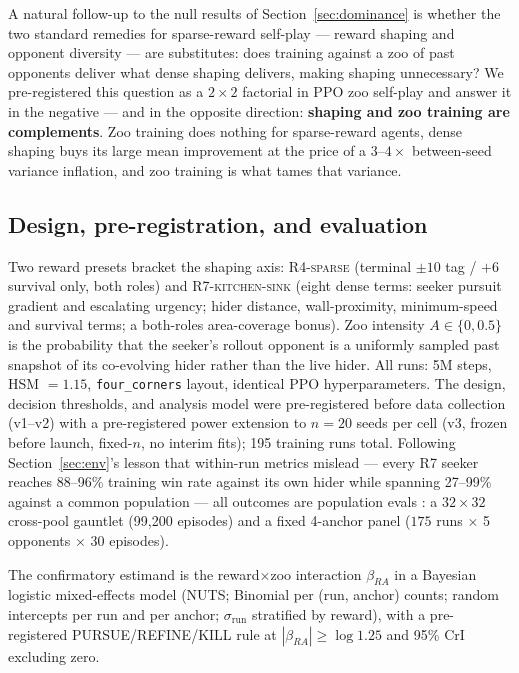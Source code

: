 \documentclass[letterpaper]{article}
\begin{document}
A natural follow-up to the null results of Section~\ref{sec:dominance}
is whether the two standard remedies for sparse-reward self-play ---
reward shaping \cite{ng1999shaping} and opponent diversity
\cite{bansal2018competitive,baker2020emergent} --- are substitutes:
does training against a zoo of past opponents deliver what dense
shaping delivers, making shaping unnecessary?
We pre-registered this question \cite{nosek2018prereg} as a $2\times2$
factorial in PPO \cite{schulman2017ppo} zoo self-play and answer it in
the negative --- and in the opposite direction: \textbf{shaping and
zoo training are complements}. Zoo training does nothing for
sparse-reward agents, dense shaping buys its large mean improvement at
the price of a $3$--$4\times$ between-seed variance inflation, and zoo
training is what tames that variance.

\subsection{Design, pre-registration, and evaluation}
\label{sec:designc-design}

Two reward presets bracket the shaping axis: \textsc{R4-sparse}
(terminal $\pm 10$ tag / $+6$ survival only, both roles) and
\textsc{R7-kitchen-sink} (eight dense terms: seeker pursuit gradient
and escalating urgency; hider distance, wall-proximity, minimum-speed
and survival terms; a both-roles area-coverage bonus).
Zoo intensity $A\in\{0,0.5\}$ is the probability that the seeker's
rollout opponent is a uniformly sampled past snapshot of its
co-evolving hider rather than the live hider.
All runs: 5M steps, HSM $=1.15$, \texttt{four\_corners} layout,
identical PPO hyperparameters.
The design, decision thresholds, and analysis model were pre-registered
before data collection (v1--v2) with a pre-registered power extension
to $n{=}20$ seeds per cell (v3, frozen before launch, fixed-$n$, no
interim fits); 195 training runs total.
Following Section~\ref{sec:env}'s lesson that within-run metrics
mislead --- every \textsc{R7} seeker reaches 88--96\% training win rate
against its own hider while spanning 27--99\% against a common
population --- all outcomes are population evals
\cite{balduzzi2018reevaluating}: a $32\times32$ cross-pool gauntlet
(99{,}200 episodes) and a fixed 4-anchor panel ($175$ runs $\times$ 5
opponents $\times$ 30 episodes).

The confirmatory estimand is the reward$\times$zoo interaction
$\beta_{RA}$ in a Bayesian logistic mixed-effects model (NUTS;
Binomial per (run, anchor) counts; random intercepts per run and per
anchor; $\sigma_{\text{run}}$ stratified by reward), with a
pre-registered PURSUE/REFINE/KILL rule at
$|\beta_{RA}|\geq\log 1.25$ and 95\% CrI excluding zero.
\end{document}

